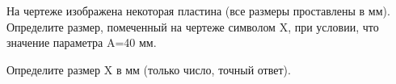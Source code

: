 
На чертеже изображена некоторая пластина (все размеры проставлены в мм).  
Определите размер, помеченный на чертеже символом X, при условии, что значение параметра A=40 мм.


Определите размер X в мм (только число, точный ответ).

